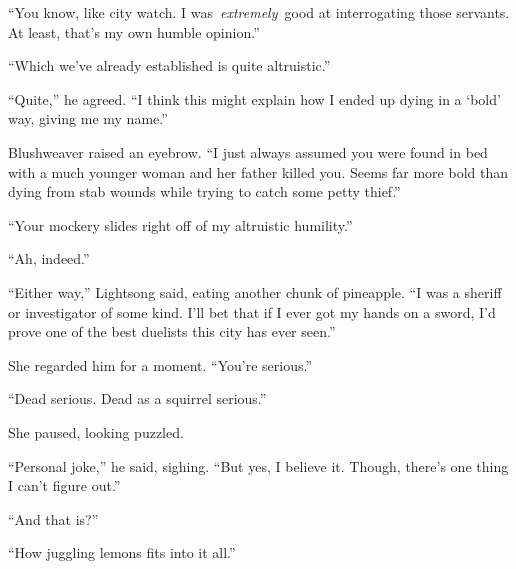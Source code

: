 “You know, like city watch. I was~\textit{extremely}~good at interrogating those servants. At least, that’s my own humble opinion.”

“Which we’ve already established is quite altruistic.”

“Quite,” he agreed. “I think this might explain how I ended up dying in a ‘bold’ way, giving me my name.”

Blushweaver raised an eyebrow. “I just always assumed you were found in bed with a much younger woman and her father killed you. Seems far more bold than dying from stab wounds while trying to catch some petty thief.”

“Your mockery slides right off of my altruistic humility.”

“Ah, indeed.”

“Either way,” Lightsong said, eating another chunk of pineapple. “I was a sheriff or investigator of some kind. I’ll bet that if I ever got my hands on a sword, I’d prove one of the best duelists this city has ever seen.”

She regarded him for a moment. “You’re serious.”

“Dead serious. Dead as a squirrel serious.”

She paused, looking puzzled.

“Personal joke,” he said, sighing. “But yes, I believe it. Though, there’s one thing I can’t figure out.”

“And that is?”

“How juggling lemons fits into it all.”

